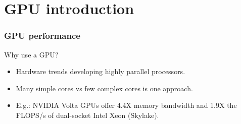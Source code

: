 \documentclass[aspectratio=169]{beamer}
\begin{document}


\section{GPU introduction}
\begin{frame}
\frametitle{GPU performance}
Why use a GPU?
\begin{itemize}
  \item Hardware trends developing highly parallel processors.
  \item Many simple cores vs few complex cores is one approach.
  \item E.g.: NVIDIA Volta GPUs offer 4.4X memory bandwidth and 1.9X the FLOPS/s of dual-socket Intel Xeon (Skylake).
\end{itemize}


\begin{columns}
\begin{column}{0.5\textwidth}
\begin{adjustbox}{max width={0.8\textwidth}}
\end{adjustbox}
\end{column}

\begin{column}{0.5\textwidth}
\begin{adjustbox}{max width={0.8\textwidth}}
\end{adjustbox}
\end{column}
\end{columns}

\end{frame}
\end{document}
